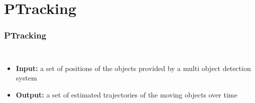 \section{PTracking}

\begin{frame}
	\frametitle{PTracking}
	
	\vspace{0.15cm}
	
	\begin{columns}[T]
		
		\vspace{0.8cm}
		
		\begin{itemize}
			\item \textbf{Input:} a set of positions of the objects provided by a multi
				  object detection system
			
			\vspace{1.6cm}
			
			\item \textbf{Output:} a set of estimated trajectories of the moving objects
				  over time
		\end{itemize}
		
		\centering
		
	\end{columns}
\end{frame}

